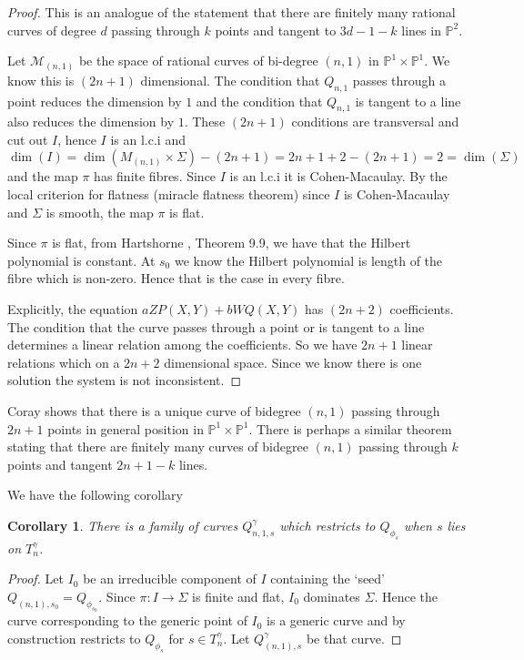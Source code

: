 \documentclass[11pt,a4paper]{article}
\newtheorem{cor}[defn]{Corollary}
\newcommand {\M}{{\mathcal M}}
\newcommand {\CP}{{\mathds P}}
\newcommand {\CPP}{\CP^1 \times \CP^1}
\def\dim{\operatorname{dim}}
\begin{document}
\begin{proof}
This is an analogue of the statement that there are finitely many rational curves of degree $d$ passing through $k$ points and tangent to $3d-1-k$ lines in $\CP^2$. 

Let $\M_{(n,1)}$ be the space of rational curves of bi-degree $(n,1)$ in $\CPP$. We know this is $(2n+1)$ dimensional. The condition that $Q_{n,1}$ passes through a point reduces the dimension by $1$ and the condition that $Q_{n,1}$ is tangent to a line also reduces the dimension by $1$. These $(2n+1)$ conditions are transversal and cut out $I$, hence $I$ is an l.c.i and  
%
$$\dim(I)=\dim(M_{(n,1)}\times \Sigma) -(2n+1)=2n+1+2-(2n+1)=2=\dim(\Sigma)$$ 
and the map $\pi$ has finite fibres. Since $I$ is an l.c.i it is  Cohen-Macaulay. By the local criterion for flatness (miracle flatness theorem)  since $I$ is Cohen-Macaulay and $\Sigma$ is smooth, the map $\pi$ is flat. 

Since $\pi$ is flat, from Hartshorne \cite{hart}, Theorem 9.9, we have that the Hilbert polynomial is constant. At $s_0$ we know the Hilbert polynomial  is  length of the fibre which is non-zero.  Hence that is the case in  every fibre. 

Explicitly, the equation $aZP(X,Y)+bWQ(X,Y)$ has $(2n+2)$ coefficients. The condition that the curve passes through a point or is tangent to a line determines a linear relation among the coefficients. So we have $2n+1$ linear relations which on a $2n+2$ dimensional space. Since we know there is one solution the system is not inconsistent.

\end{proof}

Coray \cite{cora} shows that there is a unique curve of bidegree $(n,1)$ passing through  $2n+1$ points in  general position in $\CPP$. There is perhaps a similar theorem stating that there are finitely many  curves of bidegree $(n,1)$ passing through $k$ points and tangent $2n+1-k$  lines. 

We have the following corollary

\begin{cor} There is a family of curves $Q^{\gamma}_{n,1,s}$ which restricts to $Q_{\phi_s}$ when $s$ lies on $T^{\gamma}_n$. 
	\label{deformationofQphi} 
\end{cor}

\begin{proof} Let $I_0$ be an irreducible component of $I$ containing the `seed' $Q_{(n,1),s_0}=Q_{\phi_{s_0}}$. Since $\pi: I \rightarrow \Sigma$ is finite and flat, $I_0$ dominates $\Sigma$. Hence the curve corresponding to the generic point of $I_0$ is a generic curve and by construction restricts to $Q_{\phi_s}$ for $s \in T_n^{\gamma}$. Let  $Q^{\gamma}_{(n,1),s}$ be that curve.

\end{proof}
\end{document}
